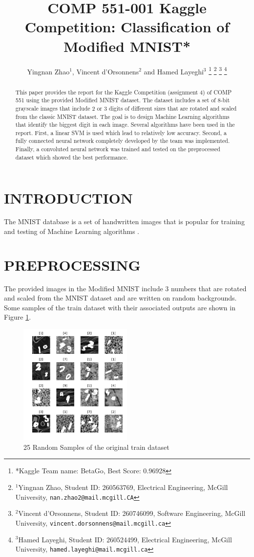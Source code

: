 \documentclass[letterpaper, 10 pt, conference]{ieeeconf}  %
\title{\LARGE \bf
COMP 551-001 Kaggle Competition: Classification of Modified MNIST*
}
\author{Yingnan Zhao$^{1}$, Vincent d'Orsonnens$^{2}$ and Hamed Layeghi$^{3}$%
\thanks{*Kaggle Team name: BetaGo, Best Score: 0.96928}%
\thanks{$^{1}$Yingnan Zhao, Student ID: 260563769, Electrical Engineering, 
        McGill University,
        {\tt\small nan.zhao2@mail.mcgill.CA}}%
\thanks{$^{2}$Vincent d'Orsonnens, Student ID: 260746099, Software Engineering, McGill University, 
        {\tt\small vincent.dorsonnens@mail.mcgill.ca}}%
\thanks{$^{3}$Hamed Layeghi, Student ID: 260524499, Electrical Engineering, McGill University, 
	{\tt\small hamed.layeghi@mail.mcgill.ca}}%
}
\begin{document}
\maketitle
\thispagestyle{empty}
\pagestyle{empty}


\begin{abstract}
This paper provides the report for the Kaggle Competition (assignment 4) of COMP 551 using the provided Modified MNIST dataset. The dataset includes a set of 8-bit grayscale images that include 2 or 3 digits of different sizes that are rotated and scaled from the classic MNIST dataset. The goal is to design Machine Learning algorithms that identify the biggest digit in each image. Several algorithms have been used in the report. First, a linear SVM is used which lead to relatively low accuracy. Second, a fully connected neural network completely developed by the team was implemented. Finally, a convoluted neural network was trained and tested on the preprocessed dataset which showed the best performance.  
\end{abstract}


\section{INTRODUCTION}

The MNIST database \cite{MNISTcreators} is a set of handwritten images that is popular for training and testing of Machine Learning algorithms \cite{wiki:MNIST}.

\section{PREPROCESSING}
The provided images in the Modified MNIST include 3 numbers that are rotated and scaled from the MNIST dataset and are written on random backgrounds.
Some samples of the train dataset with their associated outputs are shown in Figure \ref{fig:original}.
\begin{figure}[h]
	\begin{center}
		\includegraphics[width=0.5\textwidth]{figures/originalDataset.pdf}  %
		\caption{25 Random Samples of the original train dataset}
		\label{fig:original}
	\end{center}
\end{figure}
\end{document}
